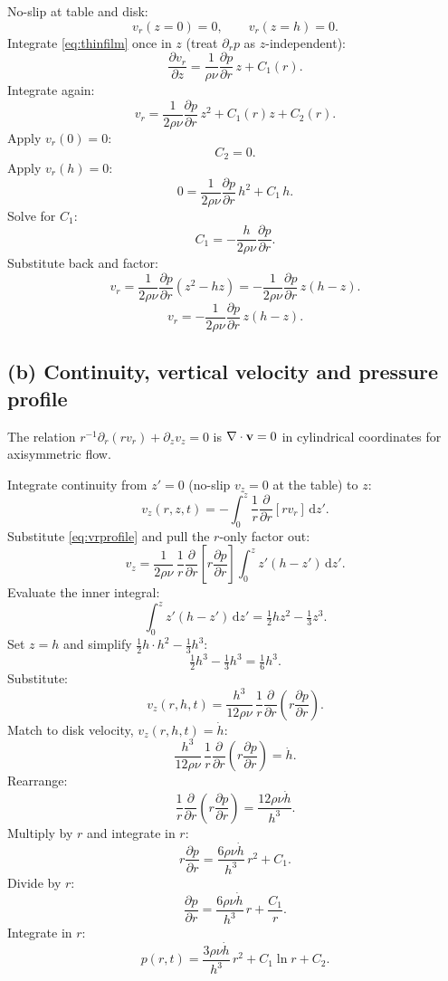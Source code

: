 \documentclass[11pt]{article}
\newcommand{\de}{\mathrm{d}}
\newcommand{\pd}[2]{\frac{\partial #1}{\partial #2}}
\begin{document}
No-slip at table and disk:
\[ v_r(z=0)=0,\qquad v_r(z=h)=0. \]
Integrate \eqref{eq:thinfilm} once in $z$ (treat $\partial_r p$ as $z$-independent):
\[ \pd{v_r}{z} = \frac{1}{\rho\nu}\pd{p}{r}\,z + C_1(r). \]
Integrate again:
\[ v_r = \frac{1}{2\rho\nu}\pd{p}{r}\,z^2 + C_1(r)z + C_2(r). \]
Apply $v_r(0)=0$:
\[ C_2 = 0. \]
Apply $v_r(h)=0$:
\[ 0 = \frac{1}{2\rho\nu}\pd{p}{r}\,h^2 + C_1\,h. \]
Solve for $C_1$:
\[ C_1 = -\frac{h}{2\rho\nu}\pd{p}{r}. \]
Substitute back and factor:
\[ v_r = \frac{1}{2\rho\nu}\pd{p}{r}(z^2-hz) = -\frac{1}{2\rho\nu}\pd{p}{r}\,z(h-z). \]
\begin{equation}
\boxed{\;v_r = -\frac{1}{2\rho\nu}\pd{p}{r}\,z(h-z).\;}
\label{eq:vrprofile}
\end{equation}

\subsection*{(b) Continuity, vertical velocity and pressure profile}

The relation $r^{-1}\partial_r(rv_r)+\partial_z v_z=0$ is $\nabla\cdot\vb v=0$ in cylindrical coordinates for axisymmetric flow.

Integrate continuity from $z'=0$ (no-slip $v_z=0$ at the table) to $z$:
\[ v_z(r,z,t) = -\int_0^z \frac{1}{r}\pd{}{r}[r v_r]\,\de z'. \]
Substitute \eqref{eq:vrprofile} and pull the $r$-only factor out:
\[ v_z = \frac{1}{2\rho\nu}\,\frac{1}{r}\pd{}{r}\!\left[r\pd{p}{r}\right]\!\int_0^z z'(h-z')\,\de z'. \]
Evaluate the inner integral:
\[ \int_0^z z'(h-z')\,\de z' = \tfrac12 hz^2 - \tfrac13 z^3. \]
Set $z=h$ and simplify $\tfrac12 h\cdot h^2-\tfrac13 h^3$:
\[ \tfrac12 h^3 - \tfrac13 h^3 = \tfrac{1}{6}h^3. \]
Substitute:
\[ v_z(r,h,t) = \frac{h^3}{12\rho\nu}\,\frac{1}{r}\pd{}{r}\!\left(r\pd{p}{r}\right). \]
Match to disk velocity, $v_z(r,h,t)=\dot h$:
\[ \frac{h^3}{12\rho\nu}\,\frac{1}{r}\pd{}{r}\!\left(r\pd{p}{r}\right) = \dot h. \]
Rearrange:
\[ \frac{1}{r}\pd{}{r}\!\left(r\pd{p}{r}\right) = \frac{12\rho\nu\dot h}{h^3}. \]
Multiply by $r$ and integrate in $r$:
\[ r\pd{p}{r} = \frac{6\rho\nu\dot h}{h^3}\,r^2 + C_1. \]
Divide by $r$:
\[ \pd{p}{r} = \frac{6\rho\nu\dot h}{h^3}\,r + \frac{C_1}{r}. \]
Integrate in $r$:
\[ p(r,t) = \frac{3\rho\nu\dot h}{h^3}\,r^2 + C_1\ln r + C_2. \]
\end{document}
